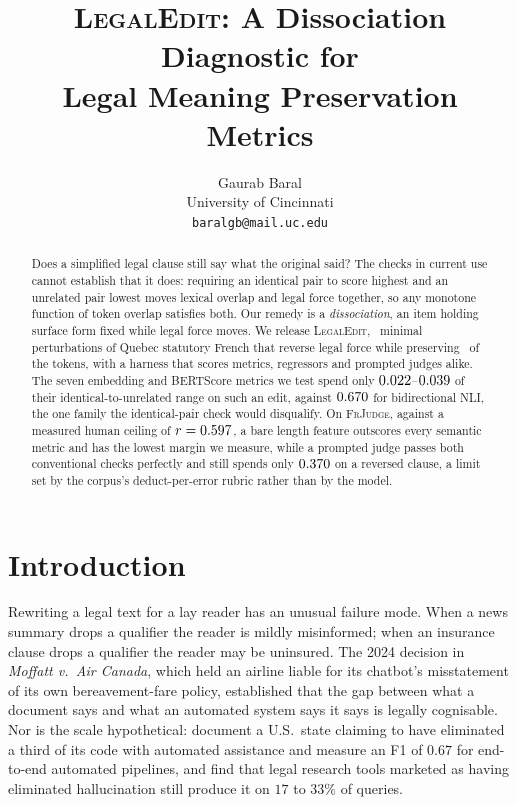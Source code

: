 \documentclass[11pt]{article}
\title{\textsc{LegalEdit}: A Dissociation Diagnostic for\\Legal Meaning Preservation Metrics}
\author{Gaurab Baral \\
  University of Cincinnati \\
  \texttt{baralgb@mail.uc.edu}}
\begin{document}
\maketitle

\begin{abstract}
Does a simplified legal clause still say what the original said? The checks in
current use cannot establish that it does: requiring an identical pair to score
highest and an unrelated pair lowest moves lexical overlap and legal force
together, so any monotone function of token overlap satisfies both. Our remedy
is a \emph{dissociation}, an item holding surface form fixed while legal force
moves. We release \textsc{LegalEdit}, \numedits\ minimal perturbations of Quebec
statutory French that reverse legal force while preserving \meanjaccard\ of the
tokens, with a harness that scores metrics, regressors and prompted judges
alike. The seven embedding and BERTScore metrics we test spend only
$0.022$--$0.039$ of their identical-to-unrelated range on such an
edit, against $0.670$ for bidirectional NLI, the one family the
identical-pair check would disqualify. On \textsc{FrJudge}, against a measured
human ceiling of $r=0.597$, a bare length feature outscores every semantic
metric and has the lowest margin we measure, while a prompted judge passes both
conventional checks perfectly and still spends only $0.370$ on a reversed
clause, a limit set by the corpus's deduct-per-error rubric rather than by the
model.
\end{abstract}

\section{Introduction}
\label{sec:intro}

Rewriting a legal text for a lay reader has an unusual failure mode. When a news
summary drops a qualifier the reader is mildly misinformed; when an insurance
clause drops a qualifier the reader may be uninsured. The 2024 decision in
\emph{Moffatt v.\ Air Canada}, which held an airline liable for its chatbot's
misstatement of its own bereavement-fare policy, established that the gap
between what a document says and what an automated system says it says is
legally cognisable. Nor is the scale hypothetical:
\citet{hariri2025statutory} document a U.S.\ state claiming to have eliminated a
third of its code with automated assistance and measure an F1 of $0.67$ for
end-to-end automated pipelines, and \citet{magesh2025hallucinationfree} find that legal research tools
marketed as having eliminated hallucination still produce it on $17$ to $33\%$
of queries.
\end{document}

